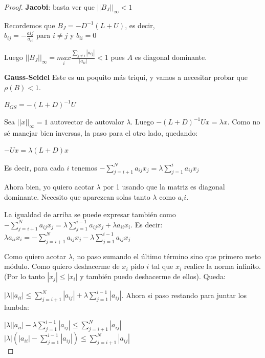 \documentclass[10pt,a4paper,final]{report}
\begin{document}
{\begin{proof}
\textbf{Jacobi}: basta ver que $||B_J||_{\infty}<1$

Recordemos que $B_J = -D^{-1}(L+U)$, es decir,\\

$b_{ij}=-\frac{a{ij}}{a_{ii}}$ para $i\neq j$ y $b_{ii}=0$

Luego $||B_J||_{\infty} = \underset{i}{max} \frac{\displaystyle \sum_{j\neq i} |a_{ij}|}{|a_{ii}|}<1$ pues $A$ es diagonal dominante. \bigskip

\textbf{Gauss-Seidel} Este es un poquito más triqui, y vamos a necesitar probar que $\rho(B)<1$.

$B_{GS} = - (L+D)^{-1} U$

Sea $||x||_\infty=1$ autovector de autovalor $\lambda$. Luego $- (L+D)^{-1} Ux = \lambda x$. Como no sé manejar bien inversas, la paso para el otro lado, quedando:

$-Ux = \lambda (L+D) x$

Es decir, para cada $i$ tenemos $- \displaystyle \sum_{j=i+1}^N a_{ij} x_j = \lambda \displaystyle \sum_{j=1}^i a_{ij} x_j$

Ahora bien, yo quiero acotar $\lambda$ por 1 usando que la matriz es diagonal dominante. Necesito que aparezcan solas tanto $\lambda$ como $a_ii$.

La igualdad de arriba se puede expresar también como $- \displaystyle \sum_{j=i+1}^N a_{ij} x_j = \lambda \displaystyle \sum_{j=1}^{i-1} a_{ij} x_j + \lambda a_{ii} x_i$. Es decir:\\

$\lambda a_{ii} x_i = - \displaystyle \sum_{j=i+1}^N a_{ij} x_j -  \lambda \displaystyle \sum_{j=1}^{i-1} a_{ij} x_j$

Como quiero acotar $\lambda$, no paso sumando el último término sino que primero meto módulo. Como quiero deshacerme de $x_i$ pido $i$ tal que $x_i$ realice la norma infinito. (Por lo tanto $|x_j|\leq |x_i|$ y también puedo deshacerme de ellos). Queda:

$|\lambda| |a_{ii}| \leq \displaystyle \sum_{j=i+1}^N |a_{ij}| + \lambda \displaystyle \sum_{j=1}^{i-1} |a_{ij}|$. Ahora si paso restando para juntar los lambda:

$|\lambda| |a_{ii}| -  \lambda \displaystyle \sum_{j=1}^{i-1} |a_{ij}|\leq \displaystyle \sum_{j=i+1}^N |a_{ij}|$\\

$|\lambda| (|a_{ii}| - \displaystyle \sum_{j=1}^{i-1} |a_{ij}|)\leq \displaystyle \sum_{j=i+1}^N |a_{ij}|$\\


\end{proof}}
\end{document}
